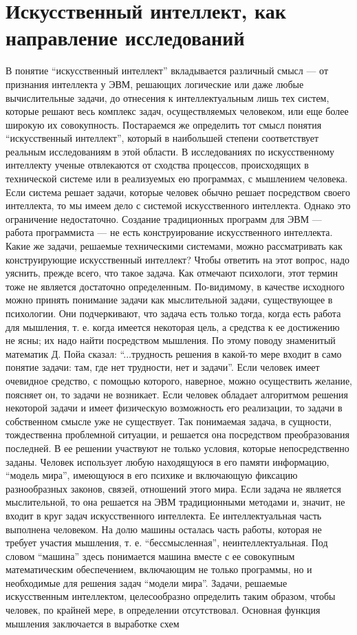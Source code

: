 \section{Искусственный интеллект, как направление исследований}

В понятие ``искусственный интеллект'' вкладывается различный смысл --- от признания интеллекта у ЭВМ, решающих логические или даже любые вычислительные задачи, до отнесения к интеллектуальным лишь тех систем, которые решают весь комплекс задач, осуществляемых человеком, или еще более широкую их совокупность. Постараемся же определить тот смысл понятия ``искусственный интеллект'', который в наибольшей степени соответствует реальным исследованиям в этой области. В исследованиях по искусственному интеллекту ученые отвлекаются от сходства процессов, происходящих в технической системе или в реализуемых ею программах, с мышлением человека. Если система решает задачи, которые человек обычно решает посредством своего интеллекта, то мы имеем дело с системой искусственного интеллекта. Однако это ограничение недостаточно. Создание традиционных программ для ЭВМ --- работа программиста --- не есть конструирование искусственного интеллекта. Какие же задачи, решаемые техническими системами, можно рассматривать как конструирующие искусственный интеллект? Чтобы ответить на этот вопрос, надо уяснить, прежде всего, что такое задача. Как отмечают психологи, этот термин тоже не является достаточно определенным. По-видимому, в качестве исходного можно принять понимание задачи как мыслительной задачи, существующее в психологии. Они подчеркивают, что задача есть только тогда, когда есть работа для мышления, т. е. когда имеется некоторая цель, а средства к ее достижению не ясны; их надо найти посредством мышления. По этому поводу знаменитый математик Д. Пойа сказал: ``...трудность решения в какой-то мере входит в само понятие задачи: там, где нет трудности, нет и задачи''. Если человек имеет очевидное средство, с помощью которого, наверное, можно осуществить желание, поясняет он, то задачи не возникает. Если человек обладает алгоритмом решения некоторой задачи и имеет физическую возможность его реализации, то задачи в собственном смысле уже не существует. Так понимаемая задача, в сущности, тождественна проблемной ситуации, и решается она посредством преобразования последней. В ее решении участвуют не только условия, которые непосредственно заданы. Человек использует любую находящуюся в его памяти информацию, ``модель мира'', имеющуюся в его психике и включающую фиксацию разнообразных законов, связей, отношений этого мира. Если задача не является мыслительной, то она решается на ЭВМ традиционными методами и, значит, не входит в круг задач искусственного интеллекта. Ее интеллектуальная часть выполнена человеком. На долю машины осталась часть работы, которая не требует участия мышления, т. е. ``бессмысленная'', неинтеллектуальная. Под словом ``машина'' здесь понимается машина вместе с ее совокупным математическим обеспечением, включающим не только программы, но и необходимые для решения задач ``модели мира''. Задачи, решаемые искусственным интеллектом, целесообразно определить таким образом, чтобы человек, по крайней мере, в определении отсутствовал. Основная функция мышления заключается в выработке схем 